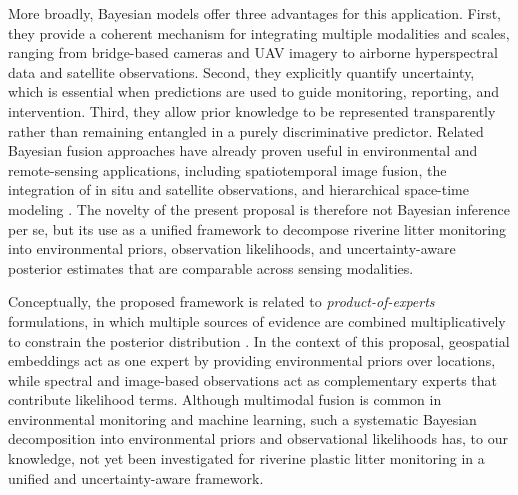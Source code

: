\documentclass{scrartcl}
\begin{document}
More broadly, Bayesian models offer three advantages for this application. First, they provide a coherent mechanism for integrating multiple modalities and scales, ranging from bridge-based cameras and UAV imagery to airborne hyperspectral data and satellite observations. Second, they explicitly quantify uncertainty, which is essential when predictions are used to guide monitoring, reporting, and intervention. Third, they allow prior knowledge to be represented transparently rather than remaining entangled in a purely discriminative predictor. Related Bayesian fusion approaches have already proven useful in environmental and remote-sensing applications, including spatiotemporal image fusion, the integration of in situ and satellite observations, and hierarchical space-time modeling \citep{xue2017bayesian,chen2021novel,he2024spatiotemporal}. The novelty of the present proposal is therefore not Bayesian inference per se, but its use as a unified framework to decompose riverine litter monitoring into environmental priors, observation likelihoods, and uncertainty-aware posterior estimates that are comparable across sensing modalities.

Conceptually, the proposed framework is related to \emph{product-of-experts} formulations, in which multiple sources of evidence are combined multiplicatively to constrain the posterior distribution \citep{hinton1999temporal}. In the context of this proposal, geospatial embeddings act as one expert by providing environmental priors over locations, while spectral and image-based observations act as complementary experts that contribute likelihood terms. Although multimodal fusion is common in environmental monitoring and machine learning, such a systematic Bayesian decomposition into environmental priors and observational likelihoods has, to our knowledge, not yet been investigated for riverine plastic litter monitoring in a unified and uncertainty-aware framework.
\end{document}
